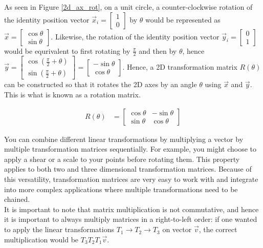 \documentclass[12pt, a4paper]{article}
\begin{document}
As seen in Figure \ref{2d_ax_rot}, on a unit circle, a counter-clockwise
rotation of the identity position vector $\vec{x}_i = \begin{bmatrix} 1 \\ 0
\end{bmatrix}$ by $\theta$ would be represented as $\vec{x} = \begin{bmatrix}
\cos\theta \\
\sin\theta \end{bmatrix}$. Likewise, the rotation of the identity position
vector $\vec{y}_i = \begin{bmatrix} 0 \\ 1 \end{bmatrix}$ would be equrivalent to first
rotating by $\frac{\pi}{2}$ and then by $\theta$, hence $\vec{y} =
\begin{bmatrix} \cos (\frac{\pi}{2} + \theta) \\
    \sin (\frac{\pi}{2} + \theta) \end{bmatrix} = \begin{bmatrix} -\sin\theta \\
\cos\theta \end{bmatrix}$. Hence, a 2D transformation matrix $R(\theta)$ can be
constructed so that it rotates the 2D axes by an angle $\theta$ using $\vec{x}$
and $\vec{y}$. This is what is known as a rotation matrix.

\begin{align*}
    R(\theta) & = \begin{bmatrix}
                      \cos\theta & -\sin\theta \\
                      \sin\theta & \cos\theta
                  \end{bmatrix}
\end{align*}

You can combine different linear transformations by multiplying a vector by
multiple transformation matrices sequentially. For example, you might choose to
apply a shear or a scale to your points before rotating them. This property
applies to both two and three dimensional transformation matrices. Because of
this versatility, transformation matrices are very easy to work with and
integrate into more complex applications where multiple transformations need to
be chained. \\

It is important to note that matrix multiplication is not commutative, and hence
it is important to always multiply matrices in a right-to-left order: if one
wanted to apply the linear transformations $T_1 \to T_2 \to T_3$ on vector
$\vec{v}$, the correct multiplication would be $T_3T_2T_1\vec{v}$.
\pagebreak
\end{document}
